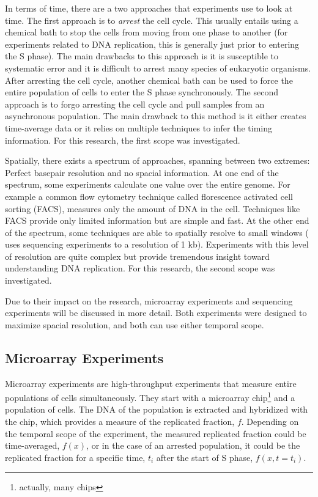 	In terms of time, there are a two approaches that experiments use to look at time.
	The first approach is to \emph{arrest} the cell cycle.
	This usually entails using a chemical bath to stop the cells from moving from one phase to another (for experiments related to DNA replication, this is generally just prior to entering the S phase).
	The main drawbacks to this approach is it is susceptible to systematic error and it is difficult to arrest many species of eukaryotic organisms.
	After arresting the cell cycle, another chemical bath can be used to force the entire population of cells to enter the S phase synchronously.
	The second approach is to forgo arresting the cell cycle and pull samples from an asynchronous population.
	The main drawback to this method is it either creates time-average data or it relies on multiple techniques to infer the timing information.
	For this research, the first scope was investigated.
	
	Spatially, there exists a spectrum of approaches, spanning between two extremes: Perfect basepair resolution and no spacial information.
	At one end of the spectrum, some experiments calculate one value over the entire genome. 
	For example a common flow cytometry technique called florescence activated cell sorting (FACS), measures only the amount of DNA in the cell.
	Techniques like FACS provide only limited information but are simple and fast.
	At the other end of the spectrum, some techniques are able to spatially resolve to small windows (\cite{DeepSeq} uses sequencing experiments to a resolution of 1 kb).
	Experiments with this level of resolution are quite complex but provide tremendous insight toward understanding DNA replication.
	For this research, the second scope was investigated.
	
	Due to their impact on the research, microarray experiments and sequencing experiments will be discussed in more detail. Both experiments were designed to maximize spacial resolution, and both can use either temporal scope.
	
		\subsection{Microarray Experiments}
		
		Microarray experiments are high-throughput experiments that measure entire populations of cells simultaneously.
		They start with a microarray chip\footnote{actually, many chips} and a population of cells.
		The DNA of the population is extracted and hybridized with the chip, which provides a measure of the replicated fraction, $f$.
		Depending on the temporal scope of the experiment, the measured replicated fraction could be time-averaged, $f(x)$, or in the case of an arrested population, it could be the replicated fraction for a specific time, $t_i$ after the start of S phase, $f(x,t=t_i)$.
		
